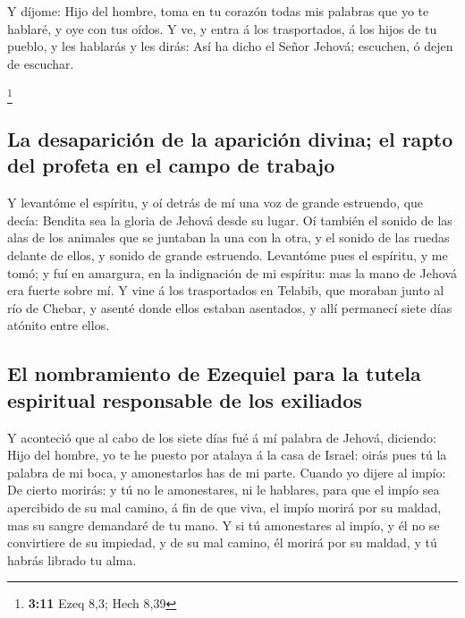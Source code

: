  Y díjome: Hijo del hombre, toma en tu corazón todas mis
palabras que yo te hablaré, y oye con tus oídos.  Y ve, y
entra á los trasportados, á los hijos de tu pueblo, y les hablarás y les
dirás: Así ha dicho el Señor Jehová; escuchen, ó dejen de escuchar.

\footnote{\textbf{3:11} Ezeq 8,3; Hech 8,39}

\hypertarget{la-desapariciuxf3n-de-la-apariciuxf3n-divina-el-rapto-del-profeta-en-el-campo-de-trabajo}{%
\subsection{La desaparición de la aparición divina; el rapto del profeta
en el campo de
trabajo}\label{la-desapariciuxf3n-de-la-apariciuxf3n-divina-el-rapto-del-profeta-en-el-campo-de-trabajo}}

 Y levantóme el espíritu, y oí detrás de mí una voz de
grande estruendo, que decía: Bendita sea la gloria de Jehová desde su
lugar.  Oí también el sonido de las alas de los animales
que se juntaban la una con la otra, y el sonido de las ruedas delante de
ellos, y sonido de grande estruendo.  Levantóme pues el
espíritu, y me tomó; y fuí en amargura, en la indignación de mi
espíritu: mas la mano de Jehová era fuerte sobre mí.  Y
vine á los trasportados en Telabib, que moraban junto al río de Chebar,
y asenté donde ellos estaban asentados, y allí permanecí siete días
atónito entre ellos.

\hypertarget{el-nombramiento-de-ezequiel-para-la-tutela-espiritual-responsable-de-los-exiliados}{%
\subsection{El nombramiento de Ezequiel para la tutela espiritual
responsable de los
exiliados}\label{el-nombramiento-de-ezequiel-para-la-tutela-espiritual-responsable-de-los-exiliados}}

 Y aconteció que al cabo de los siete días fué á mí
palabra de Jehová, diciendo:  Hijo del hombre, yo te he
puesto por atalaya á la casa de Israel: oirás pues tú la palabra de mi
boca, y amonestarlos has de mi parte.  Cuando yo dijere
al impío: De cierto morirás: y tú no le amonestares, ni le hablares,
para que el impío sea apercibido de su mal camino, á fin de que viva, el
impío morirá por su maldad, mas su sangre demandaré de tu mano.
 Y si tú amonestares al impío, y él no se convirtiere de
su impiedad, y de su mal camino, él morirá por su maldad, y tú habrás
librado tu alma.

